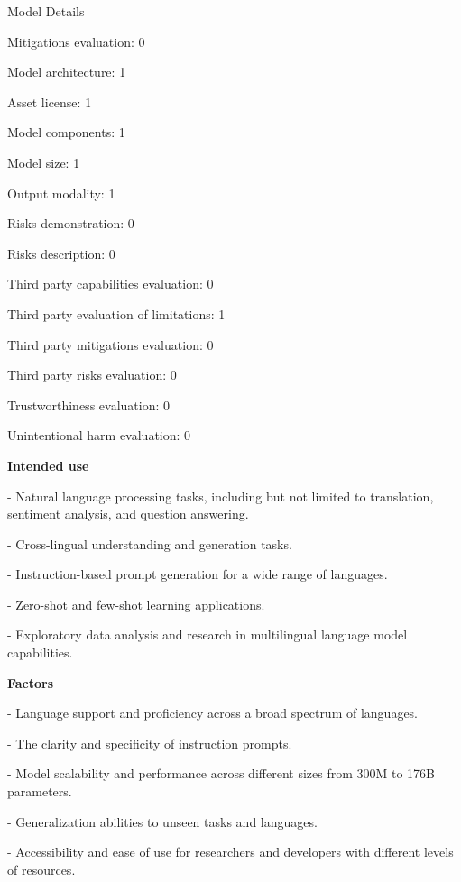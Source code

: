 \documentclass{article}
\begin{document}
\begin{adjustwidth}{-60pt}{-30pt}
\begin{singlespace}
\begin{tcolorbox}[title=\textbf{My Happy Model (test)! : Model Card},
breakable, sharp corners, boxrule=0.7pt]
\begin{mcsection}{Model Details}
    \item Mitigations evaluation: 0
    \item Model architecture: 1
    \item Asset license: 1
    \item Model components: 1
    \item Model size: 1
    \item Output modality: 1
    \item Risks demonstration: 0
    \item Risks description: 0
    \item Third party capabilities evaluation: 0
    \item Third party evaluation of limitations: 1
    \item Third party mitigations evaluation: 0
    \item Third party risks evaluation: 0
    \item Trustworthiness evaluation: 0
    \item Unintentional harm evaluation: 0
\end{mcsection}


 

    \textbf{Intended use}
            \item - Natural language processing tasks, including but not limited to translation, sentiment analysis, and question answering.
            \item - Cross-lingual understanding and generation tasks.
            \item - Instruction-based prompt generation for a wide range of languages.
            \item - Zero-shot and few-shot learning applications.
            \item - Exploratory data analysis and research in multilingual language model capabilities.
    
    \textbf{Factors}
            \item - Language support and proficiency across a broad spectrum of languages.
            \item - The clarity and specificity of instruction prompts.
            \item - Model scalability and performance across different sizes from 300M to 176B parameters.
            \item - Generalization abilities to unseen tasks and languages.
            \item - Accessibility and ease of use for researchers and developers with different levels of resources.
    

\end{tcolorbox}
\end{singlespace}
\end{adjustwidth}
\end{document}
